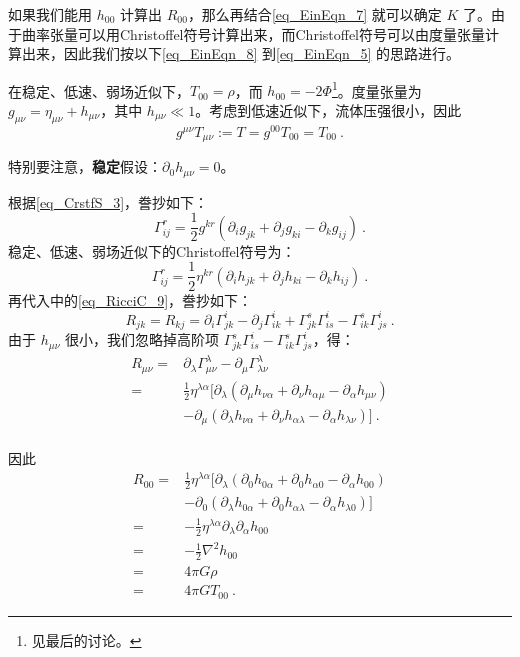 如果我们能用 $h_{00}$ 计算出 $R_{00}$，那么再结合\autoref{eq_EinEqn_7} 就可以确定 $K$ 了。由于曲率张量可以用Christoffel符号计算出来，而Christoffel符号可以由度量张量计算出来，因此我们按以下\autoref{eq_EinEqn_8} 到\autoref{eq_EinEqn_5} 的思路进行。

在稳定、低速、弱场近似下，$T_{00}=\rho$，而 $h_{00}=-2\Phi$\footnote{见最后的讨论。}。度量张量为 $g_{\mu\nu}=\eta_{\mu\nu}+h_{\mu\nu}$，其中 $h_{\mu\nu}\ll 1$。考虑到低速近似下，流体压强很小，因此 
\begin{equation}\label{eq_EinEqn_10}
g^{\mu\nu}T_{\mu\nu}:=T=g^{00}T_{00}=T_{00}~.
\end{equation}

特别要注意，\textbf{稳定}假设：$\partial_0h_{\mu\nu}=0$。


根据\autoref{eq_CrstfS_3}，誊抄如下：
\begin{equation}\label{eq_EinEqn_8}
\Gamma^{r}_{ij}=\frac{1}{2}g^{kr}(\partial_ig_{jk}+\partial_jg_{ki}-\partial_kg_{ij})~.
\end{equation}
稳定、低速、弱场近似下的Christoffel符号为：
\begin{equation}
\Gamma^{r}_{ij}=\frac{1}{2}\eta^{kr}(\partial_ih_{jk}+\partial_jh_{ki}-\partial_kh_{ij})~.
\end{equation}
再代入中的\autoref{eq_RicciC_9}，誊抄如下：
\begin{equation}
R_{jk}=R_{kj}=\partial_i\Gamma^i_{jk}-\partial_j\Gamma^{i}_{ik}+\Gamma^s_{jk}\Gamma^i_{is}-\Gamma^s_{ik}\Gamma^i_{js}~.
\end{equation}
由于 $h_{\mu\nu}$ 很小，我们忽略掉高阶项 $\Gamma^s_{jk}\Gamma^i_{is}-\Gamma^s_{ik}\Gamma^i_{js}$，得：
\begin{equation}
\begin{aligned}
R_{\mu\nu}=&\partial_\lambda\Gamma^\lambda_{\mu\nu}-\partial_{\mu}\Gamma^\lambda_{\lambda\nu}\\
=&\frac{1}{2}\eta^{\lambda\alpha}[\partial_\lambda(\partial_\mu h_{\nu \alpha}+\partial_\nu h_{\alpha\mu}-\partial_\alpha h_{\mu\nu})\\
&-\partial_\mu(\partial_\lambda h_{\nu\alpha}+\partial_\nu h_{\alpha\lambda}-\partial_\alpha h_{\lambda\nu})]~.\\
\end{aligned}
\end{equation}

因此
\begin{equation}\label{eq_EinEqn_5}
\begin{aligned}
R_{00}=&\frac{1}{2}\eta^{\lambda\alpha}[\partial_\lambda(\partial_0 h_{0 \alpha}+\partial_0 h_{\alpha0}-\partial_\alpha h_{00})\\
&-\partial_0(\partial_\lambda h_{0\alpha}+\partial_0 h_{\alpha\lambda}-\partial_\alpha h_{\lambda0})]\\
=&-\frac{1}{2}\eta^{\lambda\alpha}\partial_\lambda\partial_\alpha h_{00}\\
=&-\frac{1}{2}\nabla^2 h_{00}\\
=&4\pi G\rho\\
=&4\pi GT_{00}~.
\end{aligned}
\end{equation}

